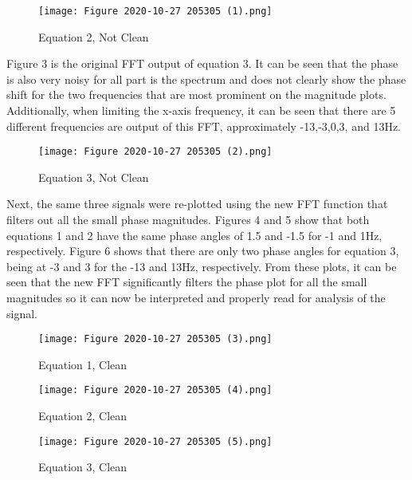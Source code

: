 \documentclass[12pt, titlepage]{article}
\begin{document}
    \begin{figure}[h!]
        \centering
        \texttt{[image: Figure 2020-10-27 205305 (1).png]}
        \caption{Equation 2, Not Clean}
        \label{fig:my_label}
    \end{figure}
    
    \clearpage
    Figure 3 is the original FFT output of equation 3.  It can be seen that the phase is also very noisy for all part is the spectrum and does not clearly show the phase shift for the two frequencies that are most prominent on the magnitude plots.  Additionally, when limiting the x-axis frequency, it can be seen that there are 5 different frequencies are output of this FFT, approximately -13,-3,0,3, and 13Hz.
    
    \begin{figure}[h!]
        \centering
        \texttt{[image: Figure 2020-10-27 205305 (2).png]}
        \caption{Equation 3, Not Clean}
        \label{fig:my_label}
    \end{figure}
    
    
    \clearpage
    Next, the same three signals were re-plotted using the new FFT function that filters out all the small phase magnitudes.  Figures 4 and 5 show that both equations 1 and 2 have the same phase angles of 1.5 and -1.5 for -1 and 1Hz, respectively.   Figure 6 shows that there are only two phase angles for equation 3, being at -3 and 3 for the -13 and 13Hz, respectively.  From these plots, it can be seen that the new FFT significantly filters the phase plot for all the small magnitudes so it can now be interpreted and properly read for analysis of the signal.
    
     \begin{figure}[h!]
        \centering
        \texttt{[image: Figure 2020-10-27 205305 (3).png]}
        \caption{Equation 1, Clean}
        \label{fig:my_label}
    \end{figure}
    
     \begin{figure}[h!]
        \centering
        \texttt{[image: Figure 2020-10-27 205305 (4).png]}
        \caption{Equation 2, Clean}
        \label{fig:my_label}
    \end{figure}
    
     \begin{figure}[h!]
        \centering
        \texttt{[image: Figure 2020-10-27 205305 (5).png]}
        \caption{Equation 3, Clean}
        \label{fig:my_label}
    \end{figure}
    
\end{document}
